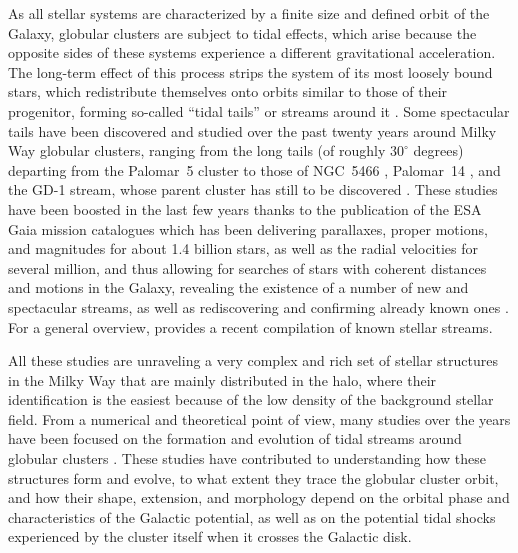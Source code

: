 As all stellar systems are characterized by a finite size and defined orbit of the Galaxy, globular clusters are  subject to tidal effects, which arise because the  opposite sides of these systems experience a different gravitational acceleration. The long-term effect of this process strips the system of its most loosely bound stars, which redistribute themselves onto orbits similar to those of their progenitor, forming so-called ``tidal tails'' or streams around it \citep[see][for some of the earliest studies]{grillmair95, leon00}. Some spectacular tails have been discovered and studied  over the past twenty years around Milky Way globular clusters, ranging from the long tails (of roughly $30^\circ$ degrees) departing from the Palomar~5 cluster \citep{odenkirchen01, odenkirchen03, grillmair06, odenkirchen09, thomas16, starkman20,  ibata21} to those of NGC~5466 \citep{belokurov06}, Palomar~14 \citep{sollima11}, and the GD-1 stream, whose parent cluster has still to be discovered \citep[or has already been completely destroyed, leaving behind the stream as the only vestige of its past existence; see][]{grillmair06b, webb19, bonaca20}. These studies have been boosted in the last few years thanks to the publication of the ESA Gaia mission catalogues \citep{gaia16, gaia18, gaia21a, gaia21b} which has been delivering parallaxes, proper motions, and magnitudes for about 1.4 billion stars, as well as the radial velocities for several million, and thus allowing for searches of stars with coherent distances and motions in the Galaxy, revealing the existence of a number of new and spectacular streams, as well as rediscovering and confirming already known ones \citep[][]{navarrete17, malhan18a, malhan18b, ibata18, piatti18,  shipp18, ibata19a, ibata19b, kaderali19, bianchini19, malhan19a, malhan19b, palau19, piatti19, caldwell20,  ibata20b, piatti20a, piatti20b, piatti20c, shipp20, thomas20, boldrini21, ibata21, malhan21, jensen21, palau21, piatti21a, piatti21b, yuan2022complexity, zhang22, nie22, piatti22}. For a general overview, \citet{mateu22} provides a recent compilation of known stellar streams.

All these studies are unraveling  a very complex and rich set of stellar structures in the Milky Way that are mainly distributed in the halo, where their identification is the easiest because of the low density of the background stellar field. 
From a numerical and theoretical point of view, many studies over the years have been focused on the formation and evolution of tidal streams around globular clusters \citep{keenan75, oh92a, oh92b, grillmair98, combes99, ibata02, johnston02, yim02, capuzzo05, dimatteo05, montuori07, siegal08, kupper10, lane10, kupper12, mastrobuono12, sanders13,  bovy14, amorisco16, erkal16, sanders16, pearson17, carlberg18,  thomas18, carlberg20, vitral2022properties}. These studies have contributed to understanding how these structures form and evolve, to what extent they trace the globular cluster orbit, and how their shape, extension, and morphology depend on the orbital phase and characteristics of the Galactic potential, as well as  on the potential tidal shocks experienced by the cluster itself when it crosses the Galactic disk.


